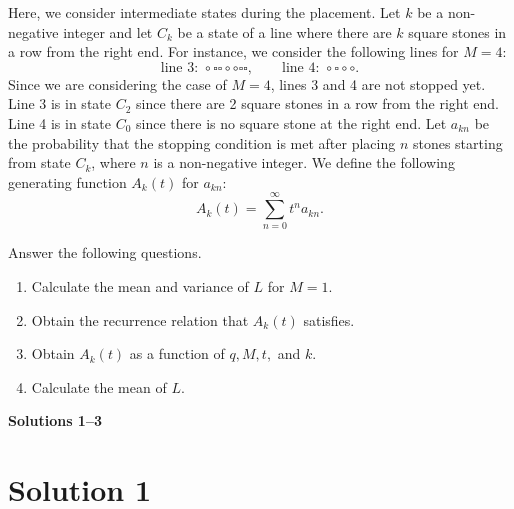 \documentclass[10pt,a4paper]{article}
\begin{document}
Here, we consider intermediate states during the placement. Let $k$ be a non-negative integer and let $C_k$ be a state of a line where there are $k$ square stones in a row from the right end. For instance, we consider the following lines for $M=4$:
\[
  \text{line 3: }\circ\square\square\circ\circ\square\square,
  \qquad
  \text{line 4: }\circ\square\circ\circ.
\]
Since we are considering the case of $M=4$, lines 3 and 4 are not stopped yet. Line 3 is in state $C_2$ since there are 2 square stones in a row from the right end. Line 4 is in state $C_0$ since there is no square stone at the right end. Let $a_{kn}$ be the probability that the stopping condition is met after placing $n$ stones starting from state $C_k$, where $n$ is a non-negative integer. We define the following generating function $A_k(t)$ for $a_{kn}$:
\[
  A_k(t)=\sum_{n=0}^{\infty}t^na_{kn}.
\]

Answer the following questions.

\begin{enumerate}
  \item Calculate the mean and variance of $L$ for $M=1$.

  \item Obtain the recurrence relation that $A_k(t)$ satisfies.

  \item Obtain $A_k(t)$ as a function of $q,M,t,$ and $k$.

  \item Calculate the mean of $L$.
\end{enumerate}

\newpage

\begin{center}
  {\Large \textbf{Solutions 1--3}}
\end{center}

\section*{Solution 1}
\end{document}
